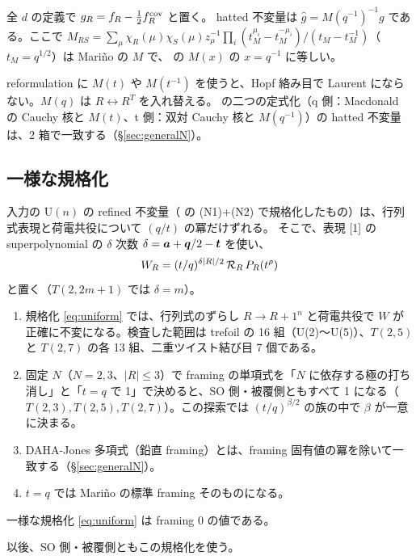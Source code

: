 \begin{definition}[クロスキャップ部分]
全 $d$ の定義で $g_R = f_R - \tfrac12 f^{\mathrm{cov}}_R$ と置く。
hatted 不変量は $\hat g = M(q^{-1})^{-1} g$ である。ここで $M_{RS} = \sum_\mu \chi_R(\mu)\chi_S(\mu) z_\mu^{-1}\prod_i (t_M^{\mu_i} - t_M^{-\mu_i})/(t_M - t_M^{-1})$（$t_M = q^{1/2}$）は Mariño の $M$ で、\cite{KN17} の $M(x)$ の $x = q^{-1}$ に等しい。
\end{definition}

\begin{remark}
reformulation に $M(t)$ や $M(t^{-1})$ を使うと、Hopf 絡み目で Laurent にならない。$M(q)$ は $R \leftrightarrow R^T$ を入れ替える。
\cite{KN17} の二つの定式化（q 側：Macdonald の Cauchy 核と $M(t)$、t 側：双対 Cauchy 核と $M(q^{-1})$）の hatted 不変量は、2 箱で一致する（§\ref{sec:generalN}）。
\end{remark}

\subsection{一様な規格化}\label{sec:uniform}
入力の U$(n)$ の refined 不変量（\cite{KN17} の (N1)+(N2) で規格化したもの）は、行列式表現と荷電共役について $(q/t)$ の冪だけずれる。
そこで、表現 [1] の superpolynomial の $\delta$ 次数 $\delta = \bm{a} + \bm{q}/2 - \bm{t}$ を使い、
\begin{equation}\label{eq:uniform}
W_R = (t/q)^{\delta |R|/2}\, \mathcal{R}_R\, P_R(t^\rho)
\end{equation}
と置く（$T(2,2m+1)$ では $\delta = m$）。

\begin{compresult}\label{cr:uniform}
\begin{enumerate}
\item 規格化 \eqref{eq:uniform} では、行列式のずらし $R \to R + 1^n$ と荷電共役で $W$ が正確に不変になる。検査した範囲は trefoil の 16 組（U(2)〜U(5)）、$T(2,5)$ と $T(2,7)$ の各 13 組、二重ツイスト結び目 7 個である。
\item 固定 $N$（$N = 2, 3$、$|R| \le 3$）で framing の単項式を「$N$ に依存する極の打ち消し」と「$t = q$ で 1」で決めると、SO 側・被覆側ともすべて 1 になる（$T(2,3), T(2,5), T(2,7)$）。この探索では $(t/q)^{\beta/2}$ の族の中で $\beta$ が一意に決まる。
\item DAHA-Jones 多項式（鉛直 framing）とは、framing 固有値の冪を除いて一致する（§\ref{sec:generalN}）。
\item $t = q$ では Mariño の標準 framing そのものになる。
\end{enumerate}
\end{compresult}

\begin{hypothesis}
一様な規格化 \eqref{eq:uniform} は framing 0 の値である。
\end{hypothesis}
以後、SO 側・被覆側ともこの規格化を使う。
